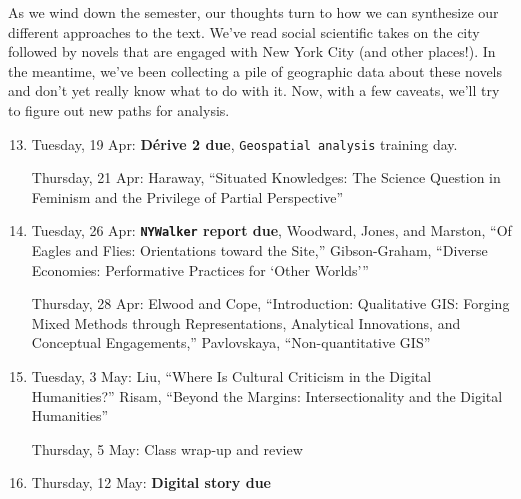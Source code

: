 As we wind down the semester, our thoughts turn to how we can synthesize our
different approaches to the text. We’ve read social scientific takes on the
city followed by novels that are engaged with New York City (and other
places!). In the meantime, we’ve been collecting a pile of geographic data
about these novels and don’t yet really know what to do with it. Now, with a
few caveats, we’ll try to figure out new paths for analysis.

\begin{enumerate}
  \setcounter{enumi}{12}

  \item Tuesday, 19 Apr: \textbf{\small Dérive 2 due}, \texttt{Geospatial analysis} training day.

    Thursday, 21 Apr: Haraway, “Situated Knowledges: The Science Question in Feminism and the Privilege of Partial Perspective”

  \item Tuesday, 26 Apr: \textbf{\texttt{NYWalker} \small report due}, Woodward, Jones, and Marston, “Of Eagles and Flies: Orientations toward the Site,” Gibson-Graham, “Diverse Economies: Performative Practices for ‘Other Worlds’”

    Thursday, 28 Apr: Elwood and Cope, “Introduction: Qualitative GIS: Forging Mixed Methods through Representations, Analytical Innovations, and Conceptual Engagements,”  Pavlovskaya, “Non-quantitative GIS”

  \item Tuesday, 3 May: Liu, “Where Is Cultural Criticism in the Digital Humanities?” Risam, “Beyond the Margins: Intersectionality and the Digital Humanities”

    Thursday, 5 May: Class wrap-up and review

  \item Thursday, 12 May: \textbf{\small Digital story due}

\end{enumerate}
